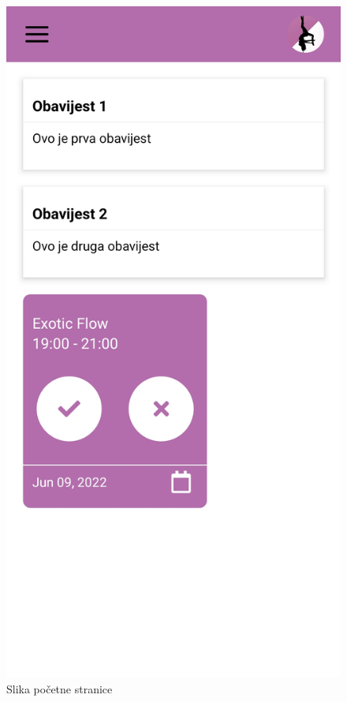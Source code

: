 \documentclass[times, utf8, zavrsni]{fer}
\begin{document}
			\begin{figure}[H]
        			\includegraphics[scale=0.2]{slike/App_podsjetnik.jpg}
        			\centering
        			\caption{Slika početne stranice}
        			\label{fig:promjene}
        		\end{figure}
			    
\end{document}
